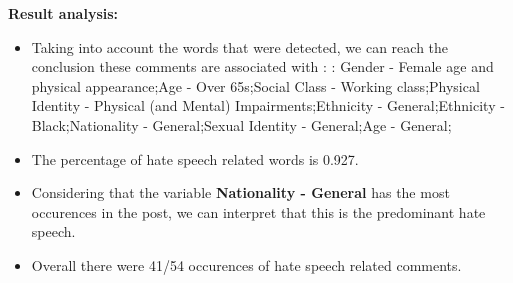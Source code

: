 \documentclass[11pt]{article}
\begin{document}
\textbf{\Large Result analysis:}

\begin{itemize}\item Taking into account the words that were detected, we can reach the conclusion these comments are associated with : : Gender - Female age and physical appearance;Age - Over 65s;Social Class - Working class;Physical Identity - Physical (and Mental) Impairments;Ethnicity - General;Ethnicity - Black;Nationality - General;Sexual Identity - General;Age - General;%

\item The percentage of hate speech related words is 0.927.

\item Considering that the variable \textbf{Nationality - General} has the most occurences in the post, we can interpret that this is the predominant hate speech.

\item Overall there were 41/54 occurences of hate speech related comments.\end{itemize}
\end{document}
